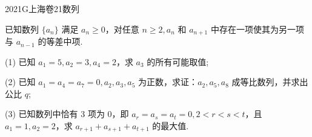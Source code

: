 
\begin{problem}{2021}{G}{上海卷}{21}{数列}

已知数列 $\{a_n\}$ 满足 $a_n \geqslant 0$，对任意 $n \geqslant 2, a_n$ 和 $a_{n+1}$ 中存在一项使其为另一项与 $a_{n-1}$ 的等差中项.

(1) 已知 $a_1=5, a_2=3, a_4=2$，求 $a_3$ 的所有可能取值;

(2) 已知 $a_1=a_4=a_7=0, a_2, a_3, a_5$ 为正数，求证：$a_2, a_5, a_8$ 成等比数列，并求出公比 $q$;

(3) 已知数列中恰有 3 项为 0，即 $a_r=a_s=a_t=0, 2<r<s<t$，且 $a_1=1, a_2=2$，求 $a_{r+1}+a_{s+1}+a_{t+1}$ 的最大值.

\end{problem}